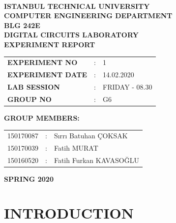 \documentclass[pdftex,12pt,a4paper]{article}
\begin{document}
\begin{titlepage}
\begin{center}
\textbf{}\\
\textbf{\Large{ISTANBUL TECHNICAL UNIVERSITY}}\\
\vspace{0.5cm}
\textbf{\Large{COMPUTER ENGINEERING DEPARTMENT}}\\
\vspace{2cm}
\textbf{\Large{BLG 242E\\ DIGITAL CIRCUITS LABORATORY\\ EXPERIMENT REPORT}}\\
\vspace{2.8cm}
\begin{table}[ht]
\centering
\Large{
\begin{tabular}{lcl}
\textbf{EXPERIMENT NO}  & : & 1 \\
\textbf{EXPERIMENT DATE}  & : & 14.02.2020 \\
\textbf{LAB SESSION}  & : & FRIDAY - 08.30 \\
\textbf{GROUP NO}  & : & G6 \\
\end{tabular}}
\end{table}
\vspace{1cm}
\textbf{\Large{GROUP MEMBERS:}}\\
\begin{table}[ht]
\centering
\Large{
\begin{tabular}{rcl}
150170087  & : & Sırrı Batuhan ÇOKSAK \\
150170039  & : & Fatih MURAT \\
150160520  & : & Fatih Furkan KAVASOĞLU \\
\end{tabular}}
\end{table}
\vspace{2.8cm}
\textbf{\Large{SPRING 2020}}

\end{center}
\end{titlepage}

\thispagestyle{empty}
\setcounter{tocdepth}{4}
\tableofcontents
\clearpage

\setcounter{page}{1}

\section{INTRODUCTION}
\end{document}
